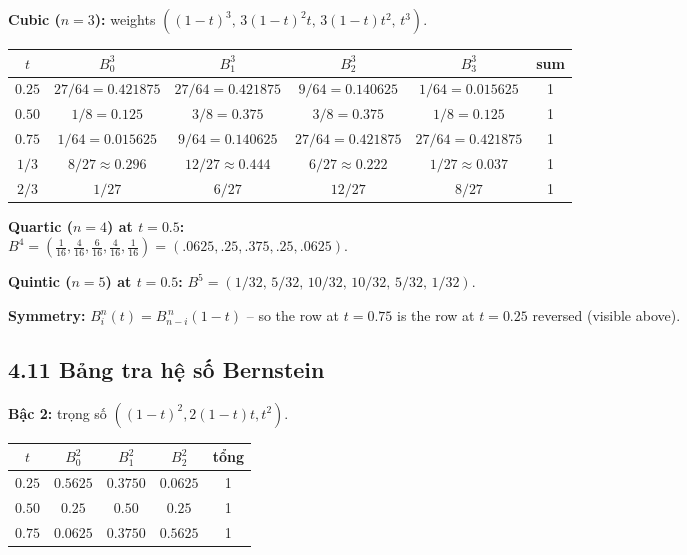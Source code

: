 \begin{paracol}{2}
\textbf{Cubic ($n=3$):} weights $((1-t)^3,\,3(1-t)^2t,\,3(1-t)t^2,\,t^3)$.
\begin{center}\small
\begin{tabular}{c|cccc|c}
$t$ & $B_0^3$ & $B_1^3$ & $B_2^3$ & $B_3^3$ & sum \\\midrule
$0.25$ & $27/64=0.421875$ & $27/64=0.421875$ & $9/64=0.140625$  & $1/64=0.015625$ & 1\\
$0.50$ & $1/8=0.125$      & $3/8=0.375$      & $3/8=0.375$      & $1/8=0.125$     & 1\\
$0.75$ & $1/64=0.015625$  & $9/64=0.140625$  & $27/64=0.421875$ & $27/64=0.421875$& 1\\
$1/3$  & $8/27\approx0.296$ & $12/27\approx0.444$ & $6/27\approx0.222$ & $1/27\approx0.037$ & 1\\
$2/3$  & $1/27$ & $6/27$ & $12/27$ & $8/27$ & 1\\
\end{tabular}
\end{center}

\textbf{Quartic ($n=4$) at $t=0.5$:}\\
$B^4=(\tfrac{1}{16},\tfrac{4}{16},\tfrac{6}{16},\tfrac{4}{16},\tfrac{1}{16})=(.0625,.25,.375,.25,.0625)$.

\textbf{Quintic ($n=5$) at $t=0.5$:}
$B^5=(1/32,\,5/32,\,10/32,\,10/32,\,5/32,\,1/32)$.

\textbf{Symmetry:} $B_i^n(t)=B_{n-i}^{\,n}(1-t)$ -- so the row at $t=0.75$ is the row at $t=0.25$ reversed (visible above).

\switchcolumn

\subsection*{4.11 Bảng tra hệ số Bernstein}

\textbf{Bậc 2:} trọng số $((1-t)^2,2(1-t)t,t^2)$.
\begin{center}\small
\begin{tabular}{c|ccc|c}
$t$ & $B_0^2$ & $B_1^2$ & $B_2^2$ & tổng \\\midrule
$0.25$ & $0.5625$ & $0.3750$ & $0.0625$ & 1\\
$0.50$ & $0.25$ & $0.50$ & $0.25$ & 1\\
$0.75$ & $0.0625$ & $0.3750$ & $0.5625$ & 1\\
\end{tabular}
\end{center}


\end{paracol}
